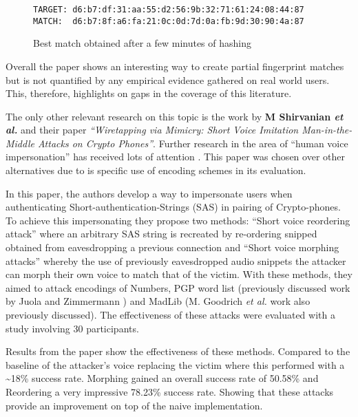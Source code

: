 \begin{figure}[!h]
    \begin{center}
        \verb|TARGET: d6:b7:df:31:aa:55:d2:56:9b:32:71:61:24:08:44:87|
        \verb|MATCH:  d6:b7:8f:a6:fa:21:0c:0d:7d:0a:fb:9d:30:90:4a:87|
    \end{center}
    \caption{Best match obtained after a few minutes of hashing}
    \label{ref:fuzz}
\end{figure}

Overall the paper shows an interesting way to create partial fingerprint matches but is not quantified by any empirical evidence gathered on real world users. This, therefore, highlights on gaps in the coverage of this literature.

The only other relevant research on this topic is the work by \textbf{M Shirvanian \textit{et al.}}\cite{shirvanian2014wiretapping} 
and their paper \textit{``Wiretapping via Mimicry: Short 
Voice Imitation Man-in-the-Middle Attacks on Crypto 
Phones''}. Further research in the area of ``human voice impersonation'' has received lots of attention \cite{mukhopadhyay2015all}\cite{chen2017you}\cite{wu2015spoofing}. This paper was chosen over other alternatives due to is specific use of encoding schemes in its evaluation.

In this paper, the authors develop a way to 
impersonate users when authenticating 
Short-authentication-Strings (SAS) in pairing of 
Crypto-phones. To achieve this impersonating they propose 
two methods: ``Short voice reordering attack'' where an 
arbitrary SAS string is recreated by re-ordering snipped 
obtained from eavesdropping a previous connection
and ``Short voice morphing attacks'' whereby the use of 
previously eavesdropped audio snippets the attacker can
morph their own voice to match that of the victim. With 
these methods, they aimed to attack encodings of Numbers, 
PGP word list (previously discussed work by Juola and 
Zimmermann \cite{juola1996whole}) and MadLib (M. Goodrich 
\textit{et al.}\cite{goodrich2006loud} work also 
previously discussed). The effectiveness of these attacks 
were evaluated with a study involving 30 participants.

Results from the paper show the effectiveness of these 
methods. Compared to the baseline of the attacker's voice 
replacing the victim where this performed with a 
\textasciitilde18\% success rate. Morphing gained an 
overall success rate of 50.58\% and Reordering a very 
impressive 78.23\% success rate. Showing that these 
attacks provide an improvement on top of the naive implementation.

